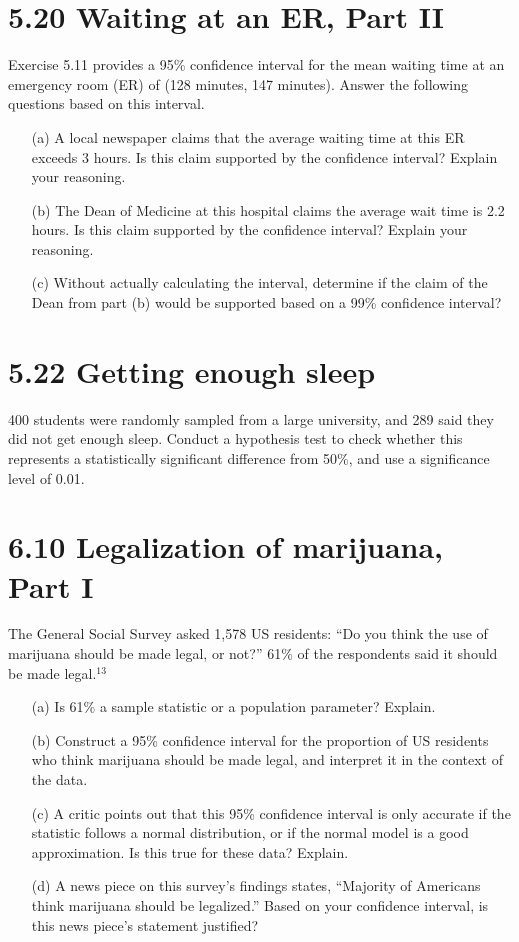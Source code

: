 \documentclass{article}
\begin{document}
\section*{5.20 Waiting at an ER, Part II}
Exercise 5.11 provides a 95\% confidence interval for the mean waiting time at an emergency room (ER) of (128 minutes, 147 minutes). Answer the following questions based on this interval.
\begin{itemize}
    \item[(a)] A local newspaper claims that the average waiting time at this ER exceeds 3 hours. Is this claim supported by the confidence interval? Explain your reasoning.
    \item[(b)] The Dean of Medicine at this hospital claims the average wait time is 2.2 hours. Is this claim supported by the confidence interval? Explain your reasoning.
    \item[(c)] Without actually calculating the interval, determine if the claim of the Dean from part (b) would be supported based on a 99\% confidence interval?
\end{itemize}

\section*{5.22 Getting enough sleep}
400 students were randomly sampled from a large university, and 289 said they did not get enough sleep. Conduct a hypothesis test to check whether this represents a statistically significant difference from 50\%, and use a significance level of 0.01.

\section*{6.10 Legalization of marijuana, Part I}
The General Social Survey asked 1,578 US residents: “Do you think the use of marijuana should be made legal, or not?” 61\% of the respondents said it should be made legal.\(^{13}\)
\begin{itemize}
    \item[(a)] Is 61\% a sample statistic or a population parameter? Explain.
    \item[(b)] Construct a 95\% confidence interval for the proportion of US residents who think marijuana should be made legal, and interpret it in the context of the data.
    \item[(c)] A critic points out that this 95\% confidence interval is only accurate if the statistic follows a normal distribution, or if the normal model is a good approximation. Is this true for these data? Explain.
    \item[(d)] A news piece on this survey’s findings states, “Majority of Americans think marijuana should be legalized.” Based on your confidence interval, is this news piece’s statement justified?
\end{itemize}
\end{document}
